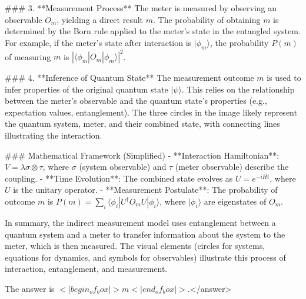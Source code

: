 ### 3. **Measurement Process**  
The meter is measured by observing an observable \(O_m\), yielding a direct result \(m\). The probability of obtaining \(m\) is determined by the Born rule applied to the meter’s state in the entangled system. For example, if the meter’s state after interaction is \(|\phi_m\rangle\), the probability \(P(m)\) of measuring \(m\) is \(|\langle \phi_m | O_m | \phi_m \rangle|^2\).  

### 4. **Inference of Quantum State**  
The measurement outcome \(m\) is used to infer properties of the original quantum state \(|\psi\rangle\). This relies on the relationship between the meter’s observable and the quantum state’s properties (e.g., expectation values, entanglement). The three circles in the image likely represent the quantum system, meter, and their combined state, with connecting lines illustrating the interaction.  

### Mathematical Framework (Simplified)  
- **Interaction Hamiltonian**: \(V = \lambda \sigma \otimes \tau\), where \(\sigma\) (system observable) and \(\tau\) (meter observable) describe the coupling.  
- **Time Evolution**: The combined state evolves as \(U = e^{-iHt}\), where \(U\) is the unitary operator.  
- **Measurement Postulate**: The probability of outcome \(m\) is \(P(m) = \sum_i \langle \phi_i | U^\dagger O_m U | \phi_i \rangle\), where \(|\phi_i\rangle\) are eigenstates of \(O_m\).  

In summary, the indirect measurement model uses entanglement between a quantum system and a meter to transfer information about the system to the meter, which is then measured. The visual elements (circles for systems, equations for dynamics, and symbols for observables) illustrate this process of interaction, entanglement, and measurement.  

The answer is \(<|begin_of_box|>m<|end_of_box|>\).</answer>